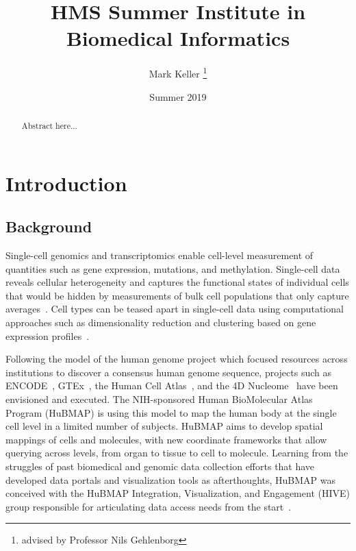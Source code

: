 \documentclass[12pt, letterpaper]{article}
\title{HMS Summer Institute in Biomedical Informatics}
\author{Mark Keller \thanks{advised by Professor Nils Gehlenborg}}
\date{Summer 2019}
\begin{document}
\maketitle

\begin{abstract}
Abstract here...
\end{abstract}

\section{Introduction}
\subsection{Background}
Single-cell genomics and transcriptomics enable cell-level measurement of quantities such as gene expression, mutations, and methylation.
Single-cell data reveals cellular heterogeneity and captures the functional states of individual cells that would be hidden by measurements of bulk cell populations that only capture averages~\cite{shapiro2013single}.
Cell types can be teased apart in single-cell data using computational approaches such as dimensionality reduction and clustering based on gene expression profiles~\cite{stegle2015computational,burgess2019spatial}.

Following the model of the human genome project which focused resources across institutions to discover a consensus human genome sequence, projects such as ENCODE~\cite{encode2004encode}, GTEx~\cite{lonsdale2013genotype}, the Human Cell Atlas~\cite{regev2017science}, and the 4D Nucleome~\cite{dekker20174d} have been envisioned and executed.
The NIH-sponsored Human BioMolecular Atlas Program (HuBMAP) is using this model to map the human body at the single cell level in a limited number of subjects.
HuBMAP aims to develop spatial mappings of cells and molecules, with new coordinate frameworks that allow querying across levels, from organ to tissue to cell to molecule.
Learning from the struggles of past biomedical and genomic data collection efforts that have developed data portals and visualization tools as afterthoughts, HuBMAP was conceived with the HuBMAP Integration, Visualization, and Engagement (HIVE) group responsible for articulating data access needs from the start~\cite{snyder2019mapping}.
\end{document}
